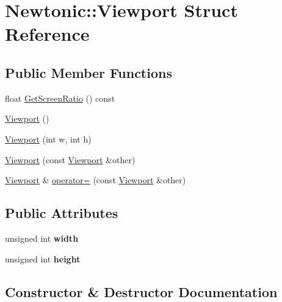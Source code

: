 \hypertarget{structNewtonic_1_1Viewport}{}\section{Newtonic\+::Viewport Struct Reference}
\label{structNewtonic_1_1Viewport}
\subsection*{Public Member Functions}
\begin{DoxyCompactItemize}
\item 
float \mbox{\hyperlink{structNewtonic_1_1Viewport_a1fcd707acdf91d581545fcf9666a53c8}{Get\+Screen\+Ratio}} () const
\item 
\mbox{\hyperlink{structNewtonic_1_1Viewport_acf97e18cd53d94c82e0905893cb6b32b}{Viewport}} ()
\item 
\mbox{\hyperlink{structNewtonic_1_1Viewport_ad1eff9e8c599b3e192fc3830bb2166db}{Viewport}} (int w, int h)
\item 
\mbox{\hyperlink{structNewtonic_1_1Viewport_a71ca24cb5e0a27abfb87f9d3ec4c0acd}{Viewport}} (const \mbox{\hyperlink{structNewtonic_1_1Viewport}{Viewport}} \&other)
\item 
\mbox{\hyperlink{structNewtonic_1_1Viewport}{Viewport}} \& \mbox{\hyperlink{structNewtonic_1_1Viewport_a72ea15f2b704e425e09c36b552a37d71}{operator=}} (const \mbox{\hyperlink{structNewtonic_1_1Viewport}{Viewport}} \&other)
\end{DoxyCompactItemize}
\subsection*{Public Attributes}
\begin{DoxyCompactItemize}
\item 
\mbox{\label{structNewtonic_1_1Viewport_ad0bef5e66936f199f07ec5c53fb9406c}} 
unsigned int {\bfseries width}
\item 
\mbox{\label{structNewtonic_1_1Viewport_ac1e706e106b0b5f21f5747eb83a08eac}} 
unsigned int {\bfseries height}
\end{DoxyCompactItemize}


\subsection{Constructor \& Destructor Documentation}
\mbox{\label{structNewtonic_1_1Viewport_acf97e18cd53d94c82e0905893cb6b32b}} 
